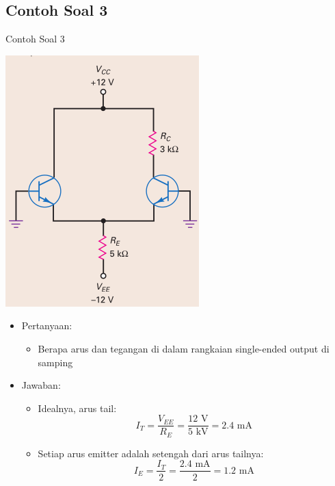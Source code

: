\documentclass[aspectratio=169]{beamer}
\begin{document}
\subsection{Contoh Soal 3}
\begin{frame}{Contoh Soal 3}
	\begin{multicols}{2}
		\begin{center}
			\includegraphics[width=0.6\textheight]{gambar/01.diff-amp/01.latihan_soal_3}
		\end{center}
		\columnbreak
		\begin{itemize}
			\item Pertanyaan:
			\begin{itemize}
				\item Berapa arus dan tegangan di dalam rangkaian single-ended output di samping
			\end{itemize}
			\item Jawaban:
			\begin{itemize}
				\item Idealnya, arus tail:
				\[ I_T = \frac{V_{EE}}{R_E} = \frac{12 \text{ V}}{5 \text{ kV}} = 2.4 \text{ mA} \]
				\item Setiap arus emitter adalah setengah dari arus tailnya:
				\[ I_E = \frac{I_T}{2} = \frac{2.4 \text{ mA}}{2} =1.2 \text{ mA} \]
			\end{itemize}
		\end{itemize}
		\vfill\null
	\end{multicols}
\end{frame}
\end{document}
